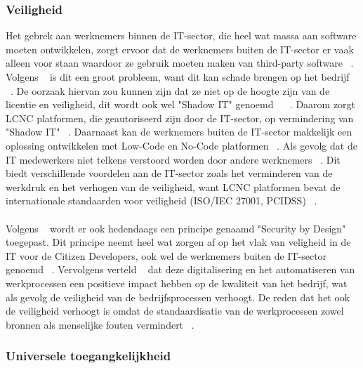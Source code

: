 \subsubsection{Veiligheid}
\label{subsec:veiligheid}
Het gebrek aan werknemers binnen de IT-sector, die heel wat massa aan software moeten ontwikkelen, zorgt ervoor dat de werknemers buiten de IT-sector
er vaak alleen voor staan waardoor ze gebruik moeten maken van third-party software ~\autocite{Yan2021}. Volgens ~\textcite{Yan2021} is dit een groot probleem,
want dit kan schade brengen op het bedrijf ~\autocite{Yan2021}. De oorzaak hiervan zou kunnen zijn dat ze niet op de hoogte zijn van de licentie en veiligheid, dit 
wordt ook wel "Shadow IT" genoemd ~\autocite{Yan2021} ~\autocite{Rokis_2022}. Daarom zorgt LCNC platformen, die geautoriseerd zijn door de IT-sector,
op vermindering van "Shadow IT" ~\autocite{Yan2021}. Daarnaast kan de werknemers buiten de IT-sector makkelijk een oplossing ontwikkelen met Low-Code en No-Code platformen  ~\autocite{Yan2021}.
Als gevolg dat de IT medewerkers niet telkens verstoord worden door andere werknemers ~\autocite{Yan2021}.  Dit biedt verschillende voordelen aan de IT-sector zoals het verminderen van de werkdruk en het verhogen van de veiligheid, want
LCNC platformen bevat de internationale standaarden voor veiligheid (ISO/IEC 27001, PCIDSS) ~\autocite{Sufi_2023}.
\\
\\
Volgens ~\textcite{Sufi_2023} wordt er ook hedendaags een principe genaamd "Security by Design" toegepast. Dit principe neemt heel wat zorgen af op het vlak van veligheid
in de IT voor de Citizen Developers, ook wel de werknemers buiten de IT-sector genoemd ~\autocite{Sufi_2023}. Vervolgens verteld ~\textcite{Elshan2023} dat deze digitalisering en het automatiseren van werkprocessen
een positieve impact hebben op de kwaliteit van het bedrijf, wat als gevolg de veiligheid van de bedrijfsprocessen verhoogt. De reden dat het ook de veiligheid verhoogt is omdat de standaardisatie van de werkprocessen zowel
bronnen als menselijke fouten vermindert ~\autocite{Elshan2023}.

\subsubsection{Universele toegangkelijkheid}
\label{subsec:universele-toegangkelijkheid}

